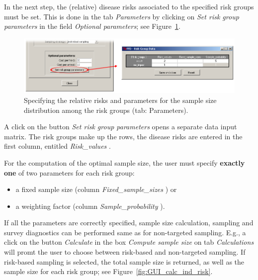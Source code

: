 \documentclass[nojss]{jss}
\begin{document}
In the next step, the (relative) disease risks associated to the specified risk groups must be set. This is done in the tab \emph{Parameters}  by clicking on  \emph{Set risk group parameters} in the field  \emph{Optional parameters}; see Figure~\ref{fig:GUI_Risk_Data}.

\begin{figure}[h!t]
\begin{center}
\includegraphics[width=125mm]{GUI_Risk_Data.png}
\end{center}
\caption{Specifying the relative risks and parameters for the sample size distribution among the risk groups (tab: Parameters).}
\label{fig:GUI_Risk_Data} \end{figure}

A click on the button \emph{Set risk group parameters} opens a separate data input matrix. The risk groups make up the rows, the disease risks are entered in the first column, entitled \emph{Risk\_values} .

For the computation of the optimal sample size, the user must specify \textbf{exactly one} of two parameters for each risk group:
%
\begin{itemize}
\item a fixed sample size (column \emph{Fixed\_sample\_sizes} ) or
\item a weighting factor (column \emph{Sample\_probability} ).
\end{itemize}
%

If all the parameters are correctly specified, sample size calculation, sampling and survey diagnostics can be performed same as for non-targeted sampling. E.g., a click on the button \emph{Calculate} in the box \emph{Compute sample size} on tab \emph{Calculations} will promt the user to choose between risk-based and non-targeted sampling. If risk-based sampling is selected, the total sample size is returned, as well as the sample size for each risk group; see Figure~\ref{fig:GUI_calc_ind_risk}.
\end{document}
